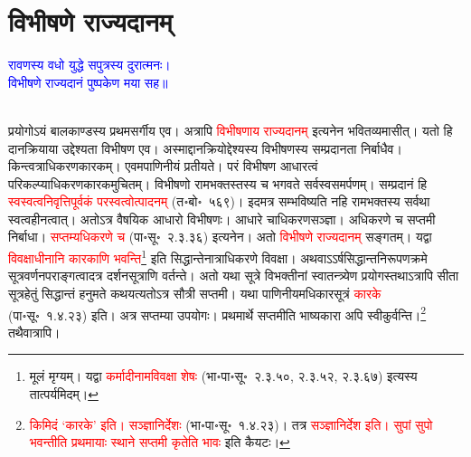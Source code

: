 \section[विभीषणे राज्यदानम्]{विभीषणे राज्यदानम्‌}
\centering\textcolor{blue}{रावणस्य वधो युद्धे सपुत्रस्य दुरात्मनः।\nopagebreak\\
विभीषणे राज्यदानं पुष्पकेण मया सह॥}\nopagebreak\\
\\
\begin{sloppypar}\justifying\noindent\hspace{10mm} प्रयोगोऽयं बाल\-काण्डस्य प्रथम\-सर्गीय एव। अत्रापि \textcolor{red}{विभीषणाय राज्य\-दानम्‌} इत्यनेन भवितव्यमासीत्। यतो हि दान\-क्रियाया उद्देश्यता विभीषण एव। अस्माद्दान\-क्रियोद्देश्यस्य विभीषणस्य सम्प्रदानता निर्बाधैव। किन्त्वत्राधिकरण\-कारकम्। एवमपाणिनीयं प्रतीयते। परं विभीषण आधारत्वं परिकल्प्याधिकरण\-कारकमुचितम्। विभीषणो राम\-भक्तस्तस्य च भगवते सर्वस्व\-समर्पणम्। सम्प्रदानं हि \textcolor{red}{स्व\-स्वत्व\-निवृत्तिपूर्वकं पर\-स्वत्वोत्पादनम्‌} (त॰बो॰~५६९)। इदमत्र सम्भविष्यति नहि राम\-भक्तस्य सर्वथा स्वत्व\-हीनत्वात्। अतोऽत्र वैषयिक आधारो विभीषणः। आधारे चाधिकरण\-सञ्ज्ञा। अधिकरणे च सप्तमी निर्बाधा। \textcolor{red}{सप्तम्यधिकरणे च} (पा॰सू॰~२.३.३६) इत्यनेन। अतो \textcolor{red}{विभीषणे राज्यदानम्‌} सङ्गतम्। यद्वा \textcolor{red}{विवक्षाधीनानि कारकाणि भवन्ति}\footnote{मूलं मृग्यम्। यद्वा \textcolor{red}{कर्मादीनामविवक्षा शेषः} (भा॰पा॰सू॰~२.३.५०, २.३.५२, २.३.६७) इत्यस्य तात्पर्यमिदम्।} इति सिद्धान्तेनात्राधिकरणे विवक्षा। अथवाऽऽर्ष\-सिद्धान्त\-निरूपण\-क्रमे सूत्र\-वर्णन\-पराङ्गत्वादत्र दर्शन\-सूत्राणि वर्तन्ते। अतो यथा सूत्रे विभक्तीनां स्वातन्त्र्येण प्रयोगस्तथाऽत्रापि सीता सूत्र\-हेतुं सिद्धान्तं हनुमते कथयत्यतोऽत्र सौत्री सप्तमी। यथा पाणिनीयमधिकार\-सूत्रं \textcolor{red}{कारके} (पा॰सू॰~१.४.२३) इति। अत्र सप्तम्या उपयोगः। प्रथमार्थे सप्तमीति भाष्यकारा अपि स्वीकुर्वन्ति।\footnote{\textcolor{red}{किमिदं ‘कारके’ इति। सञ्ज्ञानिर्देशः} (भा॰पा॰सू॰~१.४.२३)। तत्र \textcolor{red}{सञ्ज्ञानिर्देश इति। सुपां सुपो भवन्तीति प्रथमायाः स्थाने सप्तमी कृतेति भावः} इति कैयटः।} तथैवात्रापि।\end{sloppypar}
